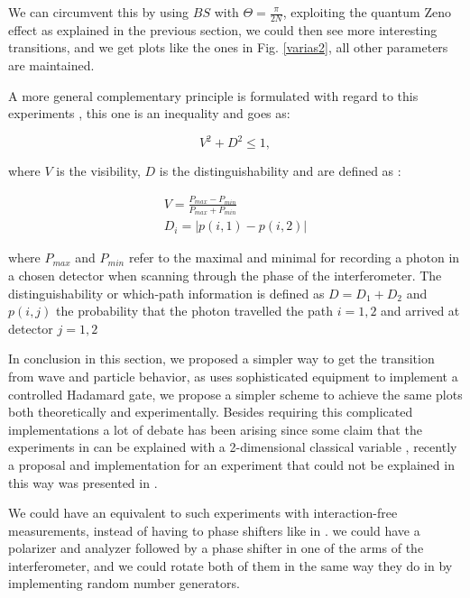 \documentclass{book}
\begin{document}
We can circumvent this by using $BS$ with $\Theta=\frac{\pi}{2N}$, exploiting the quantum Zeno effect as explained in the previous section, we could then see more interesting transitions, and we get plots like the ones in Fig. \ref{varias2}, all  other parameters are maintained.



A more general complementary principle is formulated with regard to this experiments \cite{Ma}, this one is an inequality and goes as:

\begin{equation}
 V^{2} + D^{2} \leq 1,
\end{equation}

where $V$ is the visibility, $D$ is the distinguishability and are defined as :

\begin{align}
 V= \frac{P_{max}-P_{min}}{P_{max}+P_{min}}\\
 D_{i}=|p(i,1)-p(i,2)|
\end{align}

where $P_{max}$ and $P_{min}$ refer to the maximal and minimal for recording a photon in a chosen detector when scanning through the phase of the interferometer. The distinguishability or which-path information is defined as $D=D_{1}+D_{2}$ and $p(i,j)$ the probability that the photon travelled the path $i=1,2$ and arrived at detector $j=1,2$


In conclusion in this section, we proposed a simpler way to get the transition from wave and particle behavior, as \cite{Kaiser2012,Peruzzo} uses sophisticated equipment to implement a controlled Hadamard gate, we propose a simpler scheme to achieve the same plots both theoretically and experimentally. Besides requiring this complicated implementations a lot of debate has been arising since some claim that the experiments in \cite{Kaiser2012,Peruzzo}  can be explained with a 2-dimensional classical variable \cite{Rossi,Chaves}, recently a proposal and implementation for an experiment that could not be explained in this way was presented in \cite{Polino}.

We could have an equivalent to such experiments with interaction-free measurements, instead of having to phase shifters like in \cite{Polino}. we could have a polarizer and analyzer followed by a phase shifter in one of the arms of the interferometer, and we could rotate both of them in the same way they do in \cite{Polino} by implementing random number generators.
\end{document}
